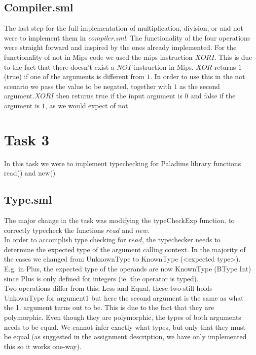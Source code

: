 \documentclass[12pt,a4paper,english]{article}
\begin{document}
\subsection{Compiler.sml}
The last step for the full implementation of multiplication, division, or and not were to implement them in \textit{compiler.sml}. The functionality of the four operations were straight forward and inspired by the ones already implemented. For the functionality of not in Mips code we used the mips instruction $XORI$. This is due to the fact that there doesn't exist a $NOT$ instruction in Mips. $XOR$ returns $1$ (true) if one of the arguments is different from $1$. In order to use this in the not scenario we pass the value to be negated, together with $1$ as the second argument.$XORI$ then returns true if the input argument is $0$ and false if the argument is $1$, as we would expect of not. 

\section{Task 3}
In this task we were to implement typechecking for Paladims library functions read() and new()

\subsection{Type.sml}
The major change in the task was modifying the typeCheckExp function, to correctly typecheck the functions $read$ and $new$. \\

In order to accomplish type checking for $read$, the typechecker needs to determine the expected type of the argument calling context. In the majority of the cases we changed from UnknownType to KnownType (<expected type>). E.g. in Plus, the expected type of the operands are now KnownType (BType Int) since Plus is only defined for integers (ie. the operator is typed). \\
Two operations differ from this; Less and Equal, these two still holds UnkownType for argument1 but here the second argument is the same as what the 1. argument turns out to be. This is due to the fact that they are polymorphic. Even though they are polymorphic, the types of both arguments needs to be equal. We cannot infer exactly what types, but only that they must be equal (as suggested in the assignment description, we have only implemented this so it works one-way).\\
\end{document}
